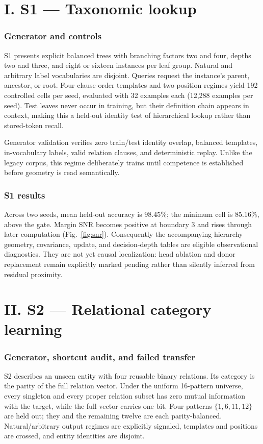 \documentclass[10pt]{article}
\begin{document}
\part{I. S1 --- Taxonomic lookup}
\section{Generator and controls}
S1 presents explicit balanced trees with branching factors two and four, depths two and three, and eight or sixteen instances per leaf group.  Natural and arbitrary label vocabularies are disjoint.  Queries request the instance's parent, ancestor, or root.  Four clause-order templates and two position regimes yield 192 controlled cells per seed, evaluated with 32 examples each (12,288 examples per seed).  Test leaves never occur in training, but their definition chain appears in context, making this a held-out identity test of hierarchical lookup rather than stored-token recall.

Generator validation verifies zero train/test identity overlap, balanced templates, in-vocabulary labels, valid relation clauses, and deterministic replay.  Unlike the legacy corpus, this regime deliberately trains until competence is established before geometry is read semantically.

\section{S1 results}
Across two seeds, mean held-out accuracy is 98.45\%; the minimum cell is 85.16\%, above the gate.  Margin SNR becomes positive at boundary 3 and rises through later computation (Fig.~\ref{fig:snr}).  Consequently the accompanying hierarchy geometry, covariance, update, and decision-depth tables are eligible observational diagnostics.  They are not yet causal localization: head ablation and donor replacement remain explicitly marked pending rather than silently inferred from residual proximity.

\part{II. S2 --- Relational category learning}
\section{Generator, shortcut audit, and failed transfer}
S2 describes an unseen entity with four reusable binary relations.  Its category is the parity of the full relation vector.  Under the uniform 16-pattern universe, every singleton and every proper relation subset has zero mutual information with the target, while the full vector carries one bit.  Four patterns $\{1,6,11,12\}$ are held out; they and the remaining twelve are each parity-balanced.  Natural/arbitrary output regimes are explicitly signaled, templates and positions are crossed, and entity identities are disjoint.
\end{document}
